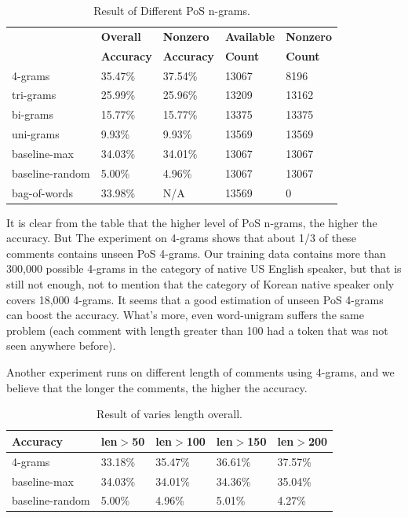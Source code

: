 \documentclass[11pt]{article}
\begin{document}
\begin{table}[h]
\begin{center}
\small\addtolength{\tabcolsep}{-5pt}
\begin{tabular}{|l|l|l|l|l|}
\hline & \bf Overall & \bf Nonzero & \bf Available & \bf Nonzero \\ 
& \bf Accuracy & \bf Accuracy & \bf Count & \bf Count \\ \hline
4-grams & 35.47\% & 37.54\%  & 13067 & 8196 \\
tri-grams & 25.99\% & 25.96\% & 13209 & 13162 \\
bi-grams & 15.77\% & 15.77\%  & 13375 & 13375\\
uni-grams & 9.93\% & 9.93\%  & 13569 & 13569 \\
baseline-max & 34.03\% & 34.01\% & 13067 & 13067 \\
baseline-random & 5.00\% & 4.96\% & 13067 & 13067 \\
bag-of-words & 33.98\% & N/A & 13569 & 0 \\
\hline
\end{tabular}
\end{center}
\caption{\label{font-table} Result of Different PoS n-grams. }
\end{table}

It is clear from the table that the higher level of PoS n-grams, the higher the accuracy. But The experiment on 4-grams shows that about 1/3 of these comments contains unseen PoS 4-grams. Our training data contains more than 300,000 possible 4-grams in the category of native US English speaker, but that is still not enough, not to mention that the category of Korean native speaker only covers 18,000 4-grams. It seems that a good estimation of unseen PoS 4-grams can boost the accuracy. What's more, even word-unigram suffers the same problem (each comment with length greater than 100 had a token that was not seen anywhere before).

Another experiment runs on different length of comments using 4-grams, and we believe that the longer the comments, the higher the accuracy.

\begin{table}[h]
\begin{center}
\small\addtolength{\tabcolsep}{-5pt}
\begin{tabular}{|l|l|l|l|l|}
\hline Accuracy & \bf len$>$50 & \bf len$>$100 & \bf len$>$150 & \bf len$>$200 \\ \hline
4-grams & 33.18\% & 35.47\%  & 36.61\% & 37.57\% \\
baseline-max & 34.03\% & 34.01\% & 34.36\% & 35.04\% \\
baseline-random & 5.00\% & 4.96\%  & 5.01\% & 4.27\%\\
\hline
\end{tabular}
\end{center}
\caption{\label{font-table} Result of varies length overall. }
\end{table}
\end{document}
